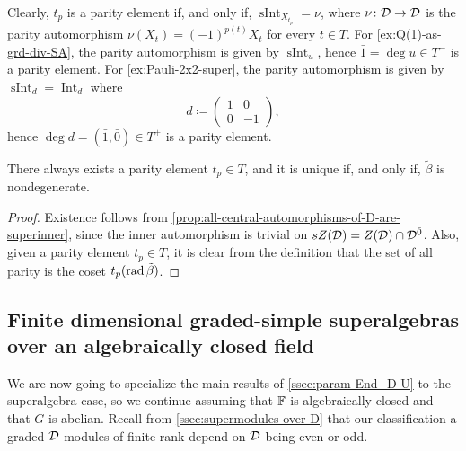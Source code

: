 Clearly, $t_p$ is a parity element if, and only if, $\operatorname{sInt}_{X_{t_p}} = \nu$, where $\nu\colon \mathcal{D} \to \mathcal{D}$ is the parity automorphism $\nu(X_t) = (-1)^{p(t)} X_t$ for every $t\in T$. 
%
For \cref{ex:Q(1)-as-grd-div-SA}, the parity automorphism is given by $\operatorname{sInt}_u$, 
hence $\bar 1 = \deg u \in T^-$ is a parity element. 
For \cref{ex:Pauli-2x2-super}, the parity automorphism is given by $\operatorname{sInt}_d = \operatorname{Int}_d$ where
\[
    d \coloneqq \begin{pmatrix}
            1 & 0\\
            0 & -1
        \end{pmatrix},
\]
hence $\deg d = (\bar 1, \bar 0) \in T^+$ is a parity element. 

\begin{cor}\label{cor:existence-parity-element}
    There always exists a parity element $t_p \in T$, and it is unique if, and only if, $\tilde\beta$ is nondegenerate.
\end{cor}

\begin{proof}
    Existence follows from \cref{prop:all-central-automorphisms-of-D-are-superinner}, since the inner automorphism is trivial on $sZ(\mathcal{D}) = Z(\mathcal{D}) \cap \mathcal{D}^{\bar0}$. 
    Also, given a parity element $t_p \in T$, it is clear from the definition that the set of all parity is the coset $t_p (\operatorname{rad} \tilde\beta)$.
\end{proof}

\subsection{Finite dimensional graded-simple superalgebras over an algebraically closed field}\label{ssec:classification-assc-super}

We are now going to specialize the main results of \cref{ssec:param-End_D-U} to the superalgebra case, so we continue assuming that $\mathbb{F}$ is algebraically closed and that $G$ is abelian. 
Recall from \cref{ssec:supermodules-over-D} that our classification a graded $\mathcal{D}$-modules of finite rank depend on $\mathcal{D}$ being even or odd.

